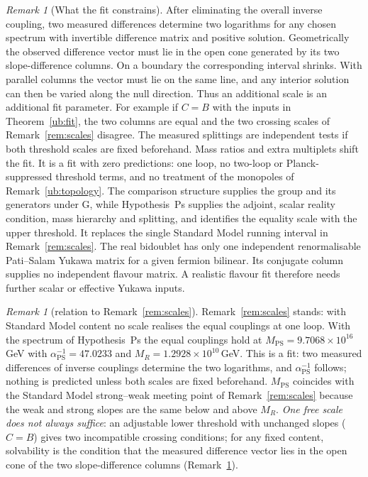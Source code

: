 \documentclass[aps,pra,onecolumn,superscriptaddress,nofootinbib,10pt]{revtex4-2}
\theoremstyle{definition}
\theoremstyle{remark}
\newtheorem{remark}[theorem]{Remark}
\begin{document}
\begin{remark}[What the fit constrains]\label{ub:fitcount}
After eliminating the overall inverse coupling, two measured differences
determine two logarithms for any chosen spectrum with invertible difference
matrix and positive solution. Geometrically the observed difference vector
must lie in the open cone generated by its two slope-difference columns.
On a boundary the corresponding interval shrinks. With parallel columns the
vector must lie on the same line, and any interior solution can then be
varied along the null direction. Thus an additional scale is an additional
fit parameter. For example if $C=B$ with the inputs in
Theorem~\ref{ub:fit}, the two columns are equal and the two crossing scales
of Remark~\ref{rem:scales} disagree. The measured splittings are independent
tests if both threshold scales are fixed beforehand.  Mass ratios and
extra multiplets shift the fit.  It is a fit with zero predictions: one loop, no two-loop or
Planck-suppressed threshold terms, and no treatment of the monopoles of Remark~\ref{ub:topology}. The comparison structure supplies the
group and its generators under G, while
Hypothesis~Ps supplies the adjoint, scalar reality condition,
mass hierarchy and splitting, and identifies the equality scale with the
upper threshold. It replaces the single Standard Model running interval in
Remark~\ref{rem:scales}. The real bidoublet has only one independent
renormalisable Pati--Salam Yukawa matrix for a given fermion bilinear.
Its conjugate column supplies no independent flavour matrix. A realistic
flavour fit therefore needs further scalar or effective Yukawa inputs.
\end{remark}

\begin{remark}[relation to Remark~\ref{rem:scales}]\label{rem:ubscales}
Remark~\ref{rem:scales} stands: with Standard Model content no scale realises the equal couplings at one
loop.  With the spectrum of Hypothesis~Ps the equal couplings hold at $M_{\mathrm{PS}}=9.7068\times10^{16}$\,GeV with $\alpha^{-1}_{\mathrm{PS}}=47.0233$ and
$M_R=1.2928\times10^{10}$\,GeV.  This is a fit: two measured differences of inverse
couplings determine the two logarithms, and $\alpha^{-1}_{\mathrm{PS}}$ follows; nothing is predicted unless both scales are fixed
beforehand.  $M_{\mathrm{PS}}$ coincides with the Standard Model strong--weak meeting point of Remark~\ref{rem:scales}
because the weak and strong slopes are the same below and above $M_R$.  \emph{One free scale does not always
suffice}: an adjustable lower threshold with unchanged slopes ($C=B$) gives two incompatible crossing
conditions; for any fixed content, solvability is the condition that the measured difference vector lies in
the open cone of the two slope-difference columns (Remark~\ref{ub:fitcount}).
\end{remark}
\end{document}
